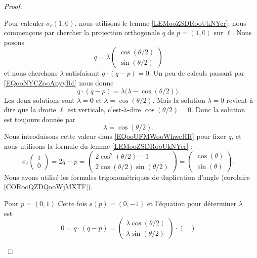 \begin{proof}
\begin{subproof}
		Pour calculer \( \sigma_{\ell}(1,0)\), nous utilisons le lemme \ref{LEMooZSDRooUkNYer}; nous commençons par chercher la projection orthogonale \( q\) de \( p=(1,0)\) sur \( \ell\). Nous posons
		\begin{equation}        \label{EQooUFMWooWhwcHR}
			q=\lambda\begin{pmatrix}
				\cos(\theta/2) \\
				\sin(\theta/2)
			\end{pmatrix}
		\end{equation}
		et nous cherchons \( \lambda\) satisfaisant \( q\cdot(q-p)=0\). Un peu de calculs passant par \eqref{EQooNYCZooApyyRd} nous donne
		\begin{equation}
			q\cdot (q-p)=\lambda\big( \lambda-\cos(\theta/2) \big).
		\end{equation}
		Les deux solutions sont \( \lambda=0\) et \( \lambda=\cos(\theta/2)\). Mais la solution \( \lambda=0\) revient à dire que la droite \( \ell\) est verticale, c'est-à-dire \( \cos(\theta/2)=0\). Donc la solution est toujours donnée par
		\begin{equation}
			\lambda=\cos(\theta/2).
		\end{equation}
		Nous introduisons cette valeur dans \eqref{EQooUFMWooWhwcHR} pour fixer \( q\), et nous utilisons la formule du lemme \ref{LEMooZSDRooUkNYer} :
		\begin{equation}
			\sigma_{\ell}\begin{pmatrix}
				1 \\
				0
			\end{pmatrix}=2q-p=\begin{pmatrix}
				2\cos^2(\theta/2)-1 \\
				2\cos(\theta/2)\sin(\theta/2)
			\end{pmatrix}
			=\begin{pmatrix}
				\cos(\theta) \\
				\sin(\theta)
			\end{pmatrix}.
		\end{equation}
		Nous avons utilisé les formules trigonométriques de duplication d'angle (corolaire \ref{CORooQZDQooWjMXTF}).
		\item[Pour \( p=(0,1)\)]
		Cette fois \( s(p)=(0,-1)\) et l'équation pour déterminer \( \lambda\) est
		\begin{equation}
			0=q\cdot(q-p)=\begin{pmatrix}
				\lambda\cos(\theta/2) \\
				\lambda\sin(\theta/2)
			\end{pmatrix}\cdot\begin{pmatrix}

\end{pmatrix}
\end{equation}
\end{subproof}
\end{proof}
